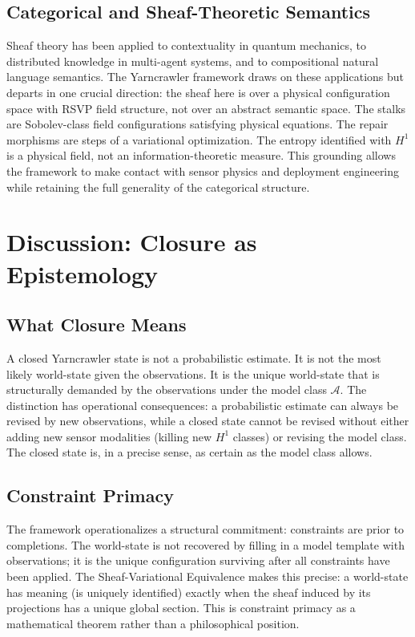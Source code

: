\documentclass[12pt, oneside]{article}
\begin{document}
\subsection{Categorical and Sheaf-Theoretic Semantics}

Sheaf theory has been applied to contextuality in quantum mechanics, to distributed
knowledge in multi-agent systems, and to compositional natural language semantics. The
Yarncrawler framework draws on these applications but departs in one crucial direction:
the sheaf here is over a physical configuration space with RSVP field structure, not over
an abstract semantic space. The stalks are Sobolev-class field configurations satisfying
physical equations. The repair morphisms are steps of a variational optimization. The
entropy identified with $H^1$ is a physical field, not an information-theoretic measure.
This grounding allows the framework to make contact with sensor physics and deployment
engineering while retaining the full generality of the categorical structure.

\section{Discussion: Closure as Epistemology}
\label{sec:epistemology}

\subsection{What Closure Means}

A closed Yarncrawler state is not a probabilistic estimate. It is not the most likely
world-state given the observations. It is the unique world-state that is structurally
demanded by the observations under the model class $\mathcal{A}$. The distinction has
operational consequences: a probabilistic estimate can always be revised by new
observations, while a closed state cannot be revised without either adding new sensor
modalities (killing new $H^1$ classes) or revising the model class. The closed state is,
in a precise sense, as certain as the model class allows.

\subsection{Constraint Primacy}

The framework operationalizes a structural commitment: constraints are prior to
completions. The world-state is not recovered by filling in a model template with
observations; it is the unique configuration surviving after all constraints have been
applied. The Sheaf-Variational Equivalence makes this precise: a world-state has meaning
(is uniquely identified) exactly when the sheaf induced by its projections has a unique
global section. This is constraint primacy as a mathematical theorem rather than a
philosophical position.
\end{document}
